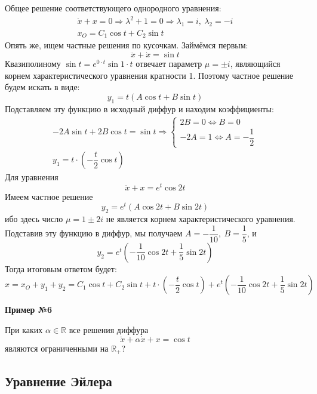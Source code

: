 \documentclass[a4paper,12pt]{article}
\newcommand{\R}{\mathbb{R}}
\newcommand{\dx}{\dot{x}}
\newcommand{\ddx}{\ddot{x}}
\newcommand{\bto}{\Longrightarrow}
\begin{document}
Общее решение соответствующего однородного уравнения:
\begin{gather*}
\ddx + x = 0 \bto \lambda^2 + 1 = 0 \bto \lambda_1 = i,\ \lambda_2 = -i\\
x_O = C_1 \cos t + C_2 \sin t
\end{gather*}
Опять же, ищем частные решения по кусочкам. 
Займёмся первым:
\[\ddx + \dx = \sin t\]
Квазиполиному $\sin t = e^{0\cdot t}\sin 1\cdot t$ отвечает параметр $\mu = \pm i$, являющийся корнем характеристического уравнения кратности 1.
Поэтому частное решение будем искать в виде:
\[y_1 = t(A\cos t + B\sin t)\]
Подставляем эту функцию в исходный диффур и находим коэффициенты:
\begin{gather*}
	-2A\sin t + 2B\cos t  = \sin t \bto \begin{cases}
		2B = 0 \iff B = 0\\
		-2A = 1\iff A = -\dfrac{1}{2}
	\end{cases}\\
	y_1 = t\cdot \left(-\dfrac{t}{2}\cos t\right)
\end{gather*}
Для уравнения
\[\ddx + x = e^t\cos 2t\]
Имеем частное решение
\[y_2 = e^t(A\cos 2t + B\sin 2t)\]
ибо здесь число $\mu = 1 \pm 2i$ не является корнем характеристического уравнения.
Подставив эту функцию в диффур, мы получаем $A = -\dfrac{1}{10},\ B = \dfrac{1}{5}$, и
\[y_2 = e^t\left(-\dfrac{1}{10}\cos 2t + \dfrac{1}{5}\sin 2t\right)\]
Тогда итоговым ответом будет:
\[x = x_O + y_1 + y_2 = C_1 \cos t + C_2 \sin t + t\cdot \left(-\dfrac{t}{2}\cos t\right) + e^t\left(-\dfrac{1}{10}\cos 2t + \dfrac{1}{5}\sin 2t\right)\]

\textbf{Пример №6}

При каких $\alpha \in \R$ все решения диффура
\[\ddx + \alpha\dx + x = \cos t\] являются ограниченными на $\R_+$?

\subsection{Уравнение Эйлера}
\end{document}
